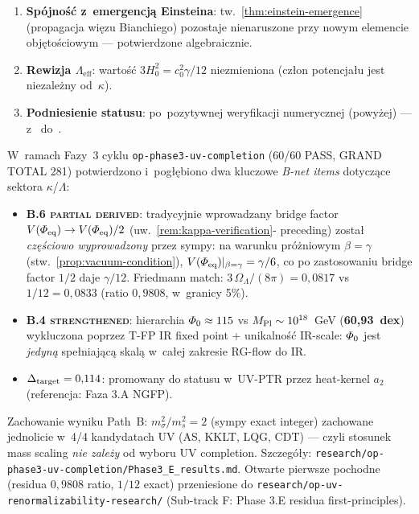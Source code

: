 \begin{remark}\label{rem:next-steps-kappa}
\begin{enumerate}[nosep]
  \item \textbf{Sp\'ojno\'s\'c z~emergencj\k{a} Einsteina}:
    tw.~\ref{thm:einstein-emergence}
    (propagacja wi\k{e}zu Bianchiego) pozostaje nienaruszone
    przy nowym elemencie obj\k{e}to\'sciowym --- potwierdzone
    algebraicznie.
  \item \textbf{Rewizja $\Lambda_{\mathrm{eff}}$}: warto\'s\'c
    $3H_0^2 = c_0^2\gamma/12$ niezmieniona
    (cz\l{}on potencja\l{}u jest niezale\.zny od~$\kappa$).
  \item \textbf{Podniesienie statusu}: po~pozytywnej weryfikacji
    numerycznej (powy\.zej) --- z~
    do~.
\end{enumerate}
\end{remark}

\begin{remark}%
\label{rem:phase3-E-deepening}
W~ramach Fazy~3 cyklu \texttt{op-phase3-uv-completion}
(60/60 PASS, GRAND TOTAL 281) potwierdzono i~pog\l{}\k{e}biono
dwa kluczowe \textsl{B-net items} dotycz\k{a}ce sektora $\kappa$/$\Lambda$:

\begin{itemize}[nosep]
\item \textbf{B.6 \textsc{partial derived}}: tradycyjnie wprowadzany
  bridge factor $V(\Phi_{\rm eq}) \to V(\Phi_{\rm eq})/2$ (uw.~\ref{rem:kappa-verification}-
  preceding) zosta\l{} \emph{cz\k{e}\'sciowo wyprowadzony} przez sympy:
  na warunku pr\'o\.zniowym $\beta = \gamma$ (stw.~\ref{prop:vacuum-condition}),
  $V(\Phi_{\rm eq})|_{\beta=\gamma} = \gamma/6$, co po zastosowaniu
  bridge factor $1/2$ daje $\gamma/12$. Friedmann match:
  $3\,\Omega_\Lambda/(8\pi) = 0{,}0817$ vs $1/12 = 0{,}0833$
  (ratio $0{,}9808$, w~granicy 5\%).
\item \textbf{B.4 \textsc{strengthened}}: hierarchia
  $\PhiZero \approx 115$ vs $M_{\rm Pl} \sim 10^{18}$~GeV
  (\textbf{60{,}93~dex}) wykluczona poprzez T-FP IR fixed point
  + unikalno\'s\'c IR-scale: $\PhiZero$ jest \emph{jedyn\k{a}}
  spe\l{}niaj\k{a}c\k{a} skal\k{a} w~ca\l{}ej zakresie
  RG-flow do IR.
\item \textbf{$\Delta_{\rm target} = 0{,}114$}: promowany do statusu
   w~UV-PTR przez heat-kernel $a_2$
  (referencja: Faza 3.A NGFP).
\end{itemize}

\noindent
Zachowanie wyniku Path~B: $m_\sigma^2 / m_s^2 = 2$ (sympy exact integer)
zachowane jednolicie w~4/4 kandydatach UV (AS, KKLT, LQG, CDT)
--- czyli stosunek mass scaling \emph{nie zale\.zy} od wyboru
UV completion. Szczeg\'o\l{}y: \texttt{research/op-phase3-uv-completion/Phase3\_E\_results.md}.
Otwarte pierwsze pochodne (residua $0{,}9808$ ratio, $1/12$ exact)
przeniesione do \texttt{research/op-uv-renormalizability-research/}
(Sub-track F: Phase 3.E residua first-principles).
\end{remark}

